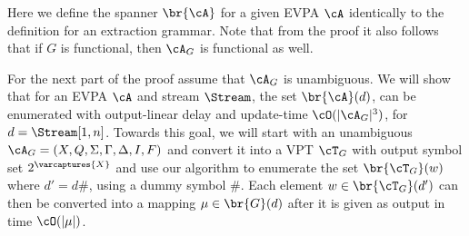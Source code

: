 Here we define the spanner $\br{\cA}$ for a given EVPA $\cA$ identically to the definition for an extraction grammar. Note that from the proof it also follows that if $G$ is functional, then $\cA_G$ is functional as well.

For the next part of the proof assume that $\cA_G$ is unambiguous. We will show that for an EVPA $\cA$ and stream $\Stream$, the set $\br{\cA}(d)$, can be enumerated with output-linear delay and update-time $\cO(\vert\cA_G\vert^3)$, for $d = \Stream[1,n]$. Towards this goal, we will start with an unambiguous $\cA_G = (X,Q,\Sigma,\Gamma,\Delta,I,F)$ and convert it into a VPT $\cT_G$ with output symbol set $2^{\varcaptures{X}}$ and use our algorithm to enumerate the set $\br{\cT_G}(w)$ where $d' = d\#$, using a dummy symbol $\#$. Each element $w\in\br{\cT_G}(d')$ can then be converted into a mapping $\mu\in\br{G}(d)$ after it is given as output in time $\cO(\vert\mu\vert)$.

